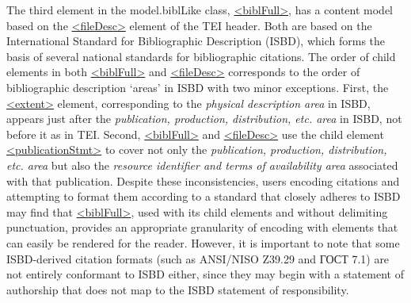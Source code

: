 The third element in the \textsf{model.biblLike} class, \hyperref[TEI.biblFull]{<biblFull>}, has a content model based on the \hyperref[TEI.fileDesc]{<fileDesc>} element of the TEI header. Both are based on the International Standard for Bibliographic Description (ISBD), which forms the basis of several national standards for bibliographic citations. The order of child elements in both \hyperref[TEI.biblFull]{<biblFull>} and \hyperref[TEI.fileDesc]{<fileDesc>} corresponds to the order of bibliographic description ‘areas’ in ISBD with two minor exceptions. First, the \hyperref[TEI.extent]{<extent>} element, corresponding to the \textit{physical description area} in ISBD, appears just after the \textit{publication, production, distribution, etc. area} in ISBD, not before it as in TEI. Second, \hyperref[TEI.biblFull]{<biblFull>} and \hyperref[TEI.fileDesc]{<fileDesc>} use the child element \hyperref[TEI.publicationStmt]{<publicationStmt>} to cover not only the \textit{publication, production, distribution, etc. area} but also the \textit{resource identifier and terms of availability area} associated with that publication. Despite these inconsistencies, users encoding citations and attempting to format them according to a standard that closely adheres to ISBD may find that \hyperref[TEI.biblFull]{<biblFull>}, used with its child elements and without delimiting punctuation, provides an appropriate granularity of encoding with elements that can easily be rendered for the reader. However, it is important to note that some ISBD-derived citation formats (such as ANSI/NISO Z39.29 and ГОСТ 7.1) are not entirely conformant to ISBD either, since they may begin with a statement of authorship that does not map to the ISBD statement of responsibility.
